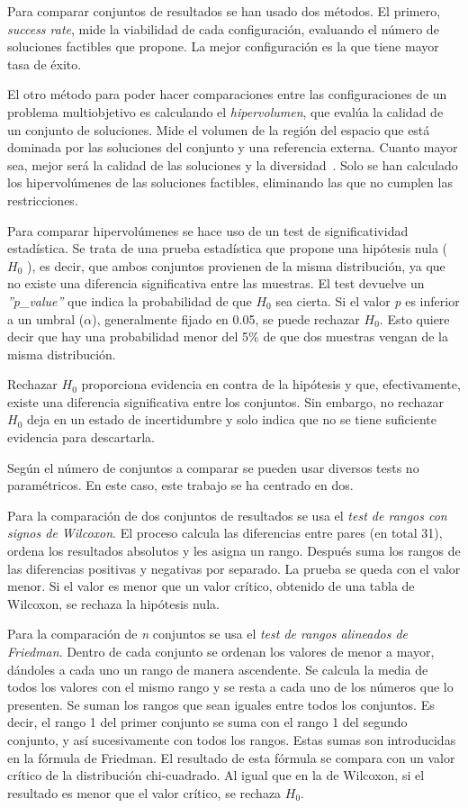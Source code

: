 Para comparar conjuntos de resultados se han usado dos métodos. El primero, \textit{success rate}, mide la viabilidad de cada configuración, evaluando el número de soluciones factibles que propone. La mejor configuración es la que tiene mayor tasa de éxito.

El otro método para poder hacer comparaciones entre las configuraciones de un problema multiobjetivo es calculando el \textit{hipervolumen}, que evalúa la calidad de un conjunto de soluciones. Mide el volumen de la región del espacio que está dominada por las soluciones del conjunto y una referencia externa. Cuanto mayor sea, mejor será la calidad de las soluciones y la diversidad~\cite{pymoo2024hypervolume}. Solo se han calculado los hipervolúmenes de las soluciones factibles, eliminando las que no cumplen las restricciones.

Para comparar hipervolúmenes se hace uso de un test de significatividad estadística. Se trata de una prueba estadística que propone una hipótesis nula (\(H_0\) ), es decir, que ambos conjuntos provienen de la misma distribución, ya que no existe una diferencia significativa entre las muestras. El test devuelve un \textit{''p\_value''} que indica la probabilidad de que \(H_0\) sea cierta. Si el valor \textit{p} es inferior a un umbral ($\alpha$), generalmente fijado en 0.05, se puede rechazar \(H_0\). Esto quiere decir que hay una probabilidad menor del 5\% de que dos muestras vengan de la misma distribución.

Rechazar \(H_0\) proporciona evidencia en contra de la hipótesis y que, efectivamente, existe una diferencia significativa entre los conjuntos. Sin embargo, no rechazar \(H_0\) deja en un estado de incertidumbre y solo indica que no se tiene suficiente evidencia para descartarla.

Según el número de conjuntos a comparar se pueden usar diversos tests no paramétricos. En este caso, este trabajo se ha centrado en dos.

Para la comparación de dos conjuntos de resultados se usa el \textit{test de rangos con signos de Wilcoxon}. El proceso calcula las diferencias entre pares (en total 31), ordena los resultados absolutos y les asigna un rango. Después suma los rangos de las diferencias positivas y negativas por separado. La prueba se queda con el valor menor. Si el valor es menor que un valor crítico, obtenido de una tabla de Wilcoxon, se rechaza la hipótesis nula.~\cite{scipy2024wilcoxon}

Para la comparación de \textit{n} conjuntos se usa el \textit{test de rangos alineados de Friedman}. Dentro de cada conjunto se ordenan los valores de menor a mayor, dándoles a cada uno un rango de manera ascendente. Se calcula la media de todos los valores con el mismo rango y se resta a cada uno de los números que lo presenten. Se suman los rangos que sean iguales entre todos los conjuntos. Es decir, el rango 1 del primer conjunto se suma con el rango 1 del segundo conjunto, y así sucesivamente con todos los rangos. Estas sumas son introducidas en la fórmula de Friedman. El resultado de esta fórmula se compara con un valor crítico de la distribución chi-cuadrado. Al igual que en la de Wilcoxon, si el resultado es menor que el valor crítico, se rechaza \(H_0\).~\cite{stac2024friedman}


